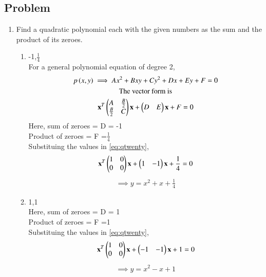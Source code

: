 \subsection{Problem}

\renewcommand{\theequation}{\theenumi}
\begin{enumerate}[label=\thesection.\arabic*.,ref=\thesection.\theenumi]

	\item Find a quadratic polynomial each with the given numbers as the sum and the product of its zeroes.
	\begin{enumerate}
	
		\item -1,$\frac{1}{4}$
		\\
		\solution For a general polynomial equation of degree 2,
	\begin{multline}
	p\left(x,y\right) \implies Ax^2 +Bxy + Cy^2 +Dx + Ey + F = 0\\
	\text{The vector form is}\\
	\mathbf{x}^T\begin{pmatrix}A&\frac{B}{2}\\\frac{B}{2}&C\end{pmatrix}\mathbf{x}  + \begin{pmatrix}D&E\end{pmatrix}\mathbf{x} + F = 0 \label{eq:qtwenty}
	\end{multline}
Here, sum of zeroes = D = -1\\
Product of zeroes = F =$\frac{1}{4}$\\
Substituing the values in \ref{eq:qtwenty},\\
\begin{multline}
\mathbf{x}^T\begin{pmatrix}1&0\\0&0\end{pmatrix}\mathbf{x}  + 
\begin{pmatrix}1&-1\end{pmatrix}\mathbf{x} +\frac{1}{4} = 0\\
\end{multline}
\begin{align}
\implies y = x^2 + x + \frac{1}{4}
\end{align}
	
		
		\item 1,1
		\\
		\solution
Here, sum of zeroes = D = 1\\
Product of zeroes = F =1\\
Substituing the values in \ref{eq:qtwenty},\\
\begin{multline}
\mathbf{x}^T\begin{pmatrix}1&0\\0&0\end{pmatrix}\mathbf{x}  + \begin{pmatrix}-1&-1\end{pmatrix}\mathbf{x} +1 = 0
\end{multline}
\begin{align}
\implies y = x^2 - x + 1 
\end{align}
		

\end{enumerate}
\end{enumerate}
